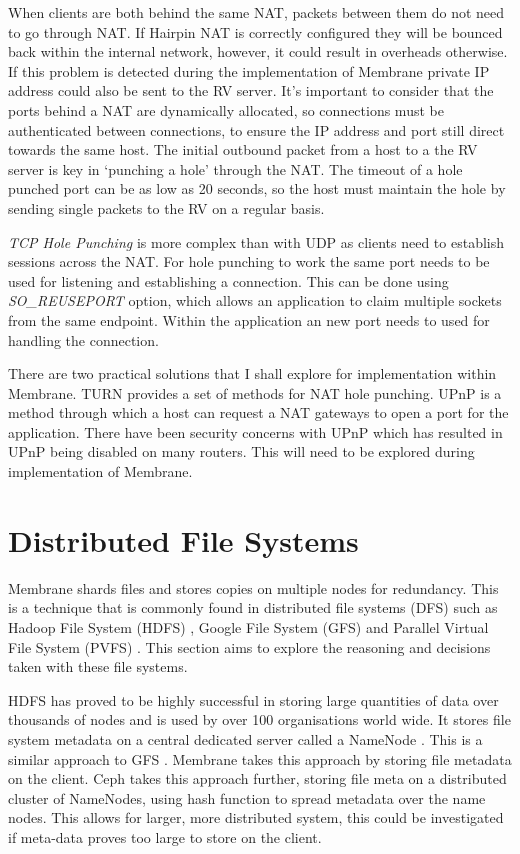 \documentclass[11pt, a4paper, twoside]{report}
\begin{document}
When clients are both behind the same NAT, packets between them do not need to go through NAT. If Hairpin NAT is correctly configured they will be bounced back within the internal network, however, it could result in overheads otherwise. If this problem is detected during the implementation of Membrane private IP address could also be sent to the RV server. It's important to consider that the ports behind a NAT are dynamically allocated, so connections must be authenticated between connections, to ensure the IP address and port still direct towards the same host. The initial outbound packet from a host to a the RV server is key in `punching a hole' through the NAT. The timeout of a hole punched port can be as low as 20 seconds, so the host must maintain the hole by sending single packets to the RV on a regular basis.

\emph{TCP Hole Punching} is more complex than with UDP as clients need to establish sessions across the NAT. For hole punching to work the same port needs to be used for listening and establishing a connection. This can be done using \emph{SO\_REUSEPORT} option, which allows an application to claim multiple sockets from the same endpoint. Within the application an new port needs to used for handling the connection.

There are two practical solutions that I shall explore for implementation within Membrane. TURN \citep{wing2010traversal} provides a set of methods for NAT hole punching. UPnP \citep{boucadair2013universal} is a method through which a host can request a NAT gateways to open a port for the application. There have been security concerns with UPnP which has resulted in UPnP being disabled on many routers. This will need to be explored during implementation of Membrane.

\section{Distributed File Systems}

Membrane shards files and stores copies on multiple nodes for redundancy. This is a technique that is commonly found in distributed file systems (DFS) such as Hadoop File System (HDFS) \citep{hdfsAnalysis}, Google File System (GFS) \citep{TheGFS} and Parallel Virtual File System (PVFS) \citep{ross2000pvfs}. This section aims to explore the reasoning and decisions taken with these file systems.

HDFS has proved to be highly successful in storing large quantities of data over thousands of nodes and is used by over 100 organisations world wide. It stores file system metadata on a central dedicated server called a NameNode \citep{hdfsAnalysis}. This is a similar approach to GFS \citep{mckusick2010gfs}. Membrane takes this approach by storing file metadata on the client. Ceph takes this approach further, storing file meta on a distributed cluster of NameNodes, using hash function to spread metadata over the name nodes. \citep{weil2006ceph} This allows for larger, more distributed system, this could be investigated if meta-data proves too large to store on the client.
\end{document}
